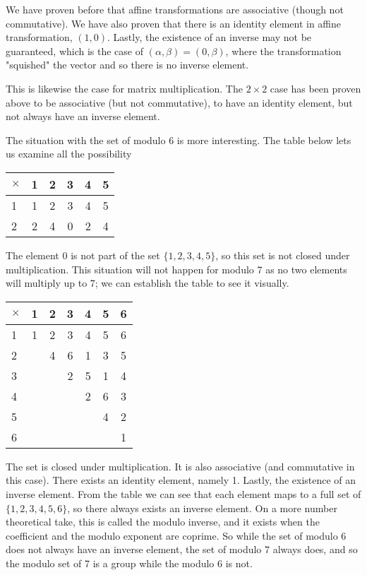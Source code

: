 We have proven before that affine transformations are associative (though not commutative). We have also proven that there is an identity element in affine transformation, $(1,0)$. Lastly, the existence of an inverse may not be guaranteed, which is the case of $(\alpha, \beta) = (0, \beta)$, where the transformation "squished" the vector and so there is no inverse element.

This is likewise the case for matrix multiplication. The $2\times2$ case has been proven above to be associative (but not commutative), to have an identity element, but not always have an inverse element.

The situation with the set of modulo 6 is more interesting. The table below lets us examine all the possibility

\begin{center}
    \begin{tabular}{l|ccccc}
        $\times$ & 1 & 2 & 3 & 4 & 5 \\
        \hline
        1        & 1 & 2 & 3 & 4 & 5 \\
        2        & 2 & 4 & 0 & 2 & 4
    \end{tabular}
\end{center}

The element 0 is not part of the set $\{1,2,3,4,5\}$, so this set is not closed under multiplication. This situation will not happen for modulo 7 as no two elements will multiply up to 7; we can establish the table to see it visually.

\begin{center}
    \begin{tabular}{l|cccccc}
        $\times$ & 1 & 2 & 3 & 4 & 5 & 6 \\
        \hline
        1        & 1 & 2 & 3 & 4 & 5 & 6 \\
        2        &   & 4 & 6 & 1 & 3 & 5 \\
        3        &   &   & 2 & 5 & 1 & 4 \\
        4        &   &   &   & 2 & 6 & 3 \\
        5        &   &   &   &   & 4 & 2 \\
        6        &   &   &   &   &   & 1
    \end{tabular}
\end{center}

The set is closed under multiplication. It is also associative (and commutative in this case). There exists an identity element, namely 1. Lastly, the existence of an inverse element. From the table we can see that each element maps to a full set of $\{1,2,3,4,5,6\}$, so there always exists an inverse element. On a more number theoretical take, this is called the modulo inverse, and it exists when the coefficient and the modulo exponent are coprime. So while the set of modulo 6 does not always have an inverse element, the set of modulo 7 always does, and so the modulo set of 7 is a group while the modulo 6 is not.


